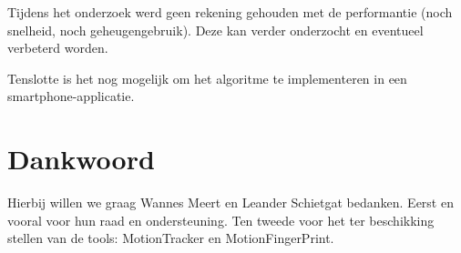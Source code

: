 \documentclass{article}
\begin{document}
Tijdens het onderzoek werd geen rekening gehouden met de performantie (noch snelheid, noch geheugengebruik). Deze kan verder onderzocht en eventueel verbeterd worden.

	


Tenslotte is het nog mogelijk om het algoritme te implementeren in een smartphone-applicatie.

\section{Dankwoord}

Hierbij willen we graag Wannes Meert en Leander Schietgat bedanken. Eerst en vooral voor hun raad en ondersteuning. Ten tweede voor het ter beschikking stellen van de tools: MotionTracker en MotionFingerPrint.







\newpage
\clearpage
\end{document}
